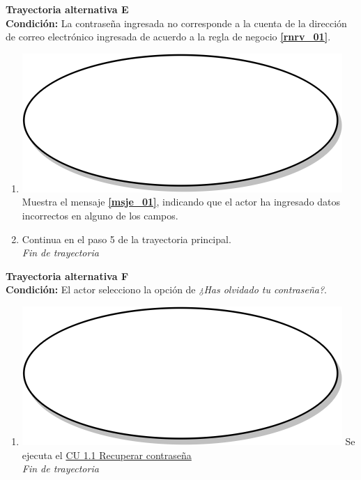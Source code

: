 \textbf{Trayectoria alternativa E} \label{cu1_ta_e}\\
\textbf{Condición:} La contraseña ingresada no corresponde a la cuenta de la dirección de correo electrónico ingresada de acuerdo a la regla de negocio \textbf{\ref{rnrv_01}}.\\
 \begin{enumerate}[label=E\arabic*]
    \item {\includegraphics[scale=.05]{Capitulo3/img/proceso.png} Muestra el mensaje \textbf{\ref{msje_01}}, indicando que el actor ha ingresado datos incorrectos en alguno de los campos.}
    \item {Continua en el paso 5 de la trayectoria principal.} \\
    \textit{Fin de trayectoria} \\
\end{enumerate}

\textbf{Trayectoria alternativa F} \label{cu1_ta_f}\\
\textbf{Condición:} El actor selecciono la opción de \textit{¿Has olvidado tu contraseña?}.\\
 \begin{enumerate}[label=F\arabic*]
    \item {\includegraphics[scale=.05]{Capitulo3/img/proceso.png} Se ejecuta el \hyperref[cu1_1]{CU 1.1 Recuperar contraseña}} \\
    \textit{Fin de trayectoria} \\
\end{enumerate}

